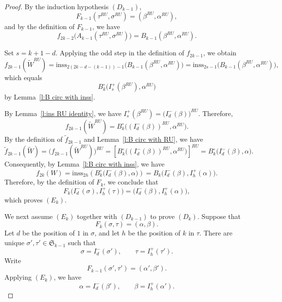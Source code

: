 \documentclass[12pt]{amsart}
\theoremstyle{definition}
\numberwithin{equation}{section}
\newcommand{\inss}[1]{\mathrm{inss}_{#1}}
\begin{document}
\begin{proof}
By the induction hypothesis $(D_{k-1})$,
\begin{equation*}
F_{k-1}(\tau^{RU},\sigma^{RU})
=
(\beta^{RU},\alpha^{RU}),
\end{equation*}
and by the definition of $F_{k-1}$, we have
\begin{equation*}
f_{2k-2}
\bigl(A_{k-1}(\tau^{RU},\sigma^{RU})\bigr)
=
B_{k-1}(\beta^{RU},\alpha^{RU}).
\end{equation*}

Set $s=k+1-d$. Applying the odd step in the definition of
$f_{2k-1}$, we obtain
\begin{equation*}
f_{2k-1}(\widetilde W^{RU})
=
\inss{2(2k-d-(k-1))-1}
\bigl(B_{k-1}(\beta^{RU},\alpha^{RU})\bigr)
=
\inss{2s-1}
\bigl(B_{k-1}(\beta^{RU},\alpha^{RU})\bigr),
\end{equation*}
which equals
\begin{equation*}
B_k^\circ
\bigl(I_s^+(\beta^{RU}),\alpha^{RU}\bigr)
\end{equation*} by Lemma~\ref{l:B circ with inss}.

By Lemma~\ref{l:ins RU identity}, we have $I_s^+(\beta^{RU}) =
\bigl(I_d^-(\beta)\bigr)^{RU}$. Therefore,
\begin{equation*}
f_{2k-1}(\widetilde W^{RU})
=
B_k^\circ
\bigl((I_d^-(\beta))^{RU},\alpha^{RU}\bigr).
\end{equation*}
By the definition of $\tilde{f}_{2k-1}$ and Lemma~\ref{l:B circ with RU}, we have
\begin{equation*}
\tilde {f}_{2k-1}(\widetilde W) = \bigr(f_{2k-1}(\widetilde W^{RU})\bigr)^{RU} = \left[
B_k^\circ
\bigl((I_d^-(\beta))^{RU},\alpha^{RU}\bigr)
\right]^{RU} =
B_k^\circ
\bigl(I_d^-(\beta),\alpha\bigr).
\end{equation*}
Consequently, by Lemma~\ref{l:B circ with inss}, we have
\begin{equation*}
f_{2k}(W)=
\inss{2h}
\left(
B_k^\circ\bigl(I_d^-(\beta),\alpha\bigr)
\right)=
B_k
\bigl(I_d^-(\beta),I_h^+(\alpha)\bigr).
\end{equation*}
Therefore, by the definition of $F_k$, we conclude that
\begin{equation*}
F_k
\bigl(I_d^-(\sigma),I_h^+(\tau)\bigr)
=
\bigl(I_d^-(\beta),I_h^+(\alpha)\bigr),
\end{equation*}
which proves $(E_k)$.

We next assume $(E_{k})$ together with $(D_{k-1})$
to prove $(D_k)$. Suppose that
\begin{equation*}
F_k(\sigma,\tau)=(\alpha,\beta).
\end{equation*}
Let $d$ be the position of $1$ in $\sigma$, and let $h$ be the position
of $k$ in $\tau$. There are unique
$\sigma',\tau'\in\mathfrak{S}_{k-1}$ such that
\begin{equation*}
\sigma=I_d^-(\sigma'),
\qquad
\tau=I_h^+(\tau').
\end{equation*}
Write
\begin{equation*}
F_{k-1}(\sigma',\tau')=(\alpha',\beta').
\end{equation*}
Applying $(E_k)$, we have
\begin{equation*}
\alpha=I_d^-(\beta'),
\qquad
\beta=I_h^+(\alpha').
\end{equation*}


\end{proof}
\end{document}
